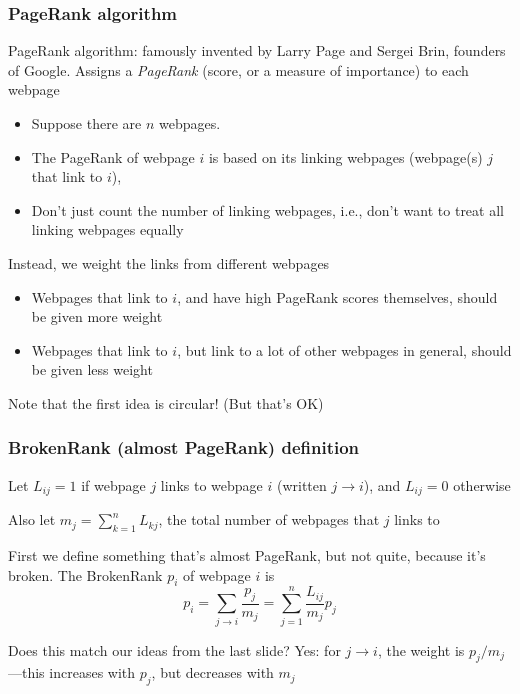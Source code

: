 \documentclass[mathserif]{beamer}
\def\red{\color[rgb]{0.8,0,0}}
\begin{document}
\begin{frame}
\frametitle{PageRank algorithm}
{\red PageRank algorithm}: famously invented 
by Larry Page and Sergei Brin, founders of Google.
Assigns a {\it PageRank} 
(score, or a measure of importance) to each webpage

\bigskip
\begin{itemize}
\item Suppose there are $n$ webpages.
\item The PageRank of webpage $i$ is based on its 
{\red linking webpages} (webpage(s) $j$ that link to $i$),
\item  Don't just count the number of linking 
webpages, i.e., don't want to treat all linking webpages 
equally
\end{itemize}

\bigskip
Instead, we {\red weight} the links 
from different webpages
\begin{itemize}
\item Webpages that link to $i$, and have high
PageRank scores themselves, should be given
{\red more weight} 
\item Webpages that link to $i$, but link to 
a lot of other webpages in general, should be
given {\red less weight}
\end{itemize}

\bigskip
Note that the first idea is circular! 
(But that's OK)
\end{frame}

\begin{frame}
\frametitle{BrokenRank (almost PageRank) definition}
Let $L_{ij}=1$ if webpage $j$ links to webpage $i$ 
(written $j \rightarrow i$), and $L_{ij}=0$ otherwise

\bigskip
Also let $m_j = \sum_{k=1}^n L_{kj}$,
the total number of webpages that $j$ links to

\bigskip
First we define something that's almost
PageRank, but not quite, because it's broken. 
The {\red BrokenRank $p_i$} of webpage $i$ is
$$p_i 
= \sum_{j \rightarrow i} \frac{p_j}{m_j}
=\sum_{j=1}^n \frac{L_{ij}}{m_j} p_j$$

\bigskip
Does this {\red match our ideas} from the last 
slide? Yes: for $j \rightarrow i$, the weight is 
$p_j/m_j$---this increases with $p_j$, but 
decreases with $m_j$
\end{frame}
\end{document}
